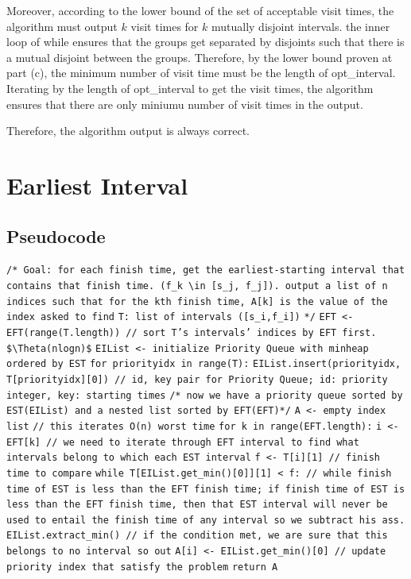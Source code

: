 \documentclass[11pt]{article}
\begin{document}
Moreover, according to the lower bound of the set of acceptable visit times, the algorithm must output $k$ visit times for $k$ mutually disjoint intervals. the inner loop of while ensures that the groups get separated by disjoints such that there is a mutual disjoint between the groups. Therefore, by the lower bound proven at part (c), the minimum number of visit time must be the length of opt\_interval. Iterating by the length of opt\_interval to get the visit times, the algorithm ensures that there are only miniumu number of visit times in the output.

Therefore, the algorithm output is always correct.
\section{Earliest Interval}
\subsection{Pseudocode}
\begin{algorithm}[H]
\small
\SetAlgoNoEnd
\DontPrintSemicolon
\caption{EarlyInterval(T: list[list[int, int]]) $\to$ list[int]}
\texttt{/* Goal: for each finish time, get the earliest-starting interval that contains that finish time. (f\_k \textbackslash{}in [s\_j, f\_j]). output a list of n indices such that for the kth finish time, A[k] is the value of the index asked to find}\;
\BlankLine
\texttt{T: list of intervals ([s\_i,f\_i])}\;
\texttt{*/}\;
\BlankLine
\texttt{EFT <- EFT(range(T.length)) // sort T's intervals' indices by EFT first. \$\textbackslash{}Theta(nlogn)\$}\;
\BlankLine
\texttt{EIList <- initialize Priority Queue with minheap ordered by EST}\;
\BlankLine
\texttt{for priorityidx in range(T):}\;
\Indp
\texttt{EIList.insert(priorityidx, T[priorityidx][0]) // id, key pair for Priority Queue; id: priority integer, key: starting times}\;
\BlankLine
\Indm
\texttt{/* now we have a priority queue sorted by EST(EIList) and a nested list sorted by EFT(EFT)*/}\;
\BlankLine
\texttt{A <- empty index list}\;
\texttt{// this iterates O(n) worst time}\;
\texttt{for k in range(EFT.length):}\;
\Indp
\texttt{i <- EFT[k] // we need to iterate through EFT interval to find what intervals belong to which each EST interval}\;
\texttt{f <- T[i][1] // finish time to compare}\;
\BlankLine
\texttt{while T[EIList.get\_min()[0]][1] < f: // while finish time of EST is less than the EFT finish time; if finish time of EST is less than the EFT finish time, then that EST interval will never be used to entail the finish time of any interval so we subtract his ass.}\;
\Indp
\texttt{EIList.extract\_min() // if the condition met, we are sure that this belongs to no interval so out}\;
\BlankLine
\Indm
\texttt{A[i] <- EIList.get\_min()[0] // update priority index that satisfy the problem}\;
\Indm
\texttt{return A}\;
\end{algorithm}
\end{document}
